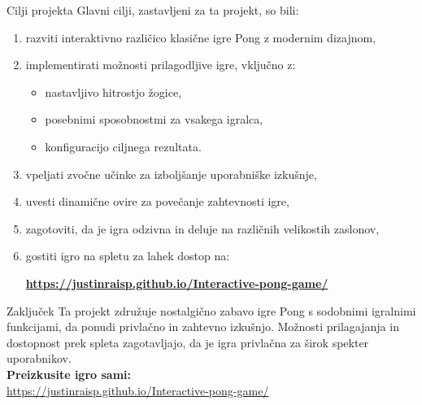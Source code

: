\documentclass{beamer}
\begin{document}
\begin{frame}{Cilji projekta}
    Glavni cilji, zastavljeni za ta projekt, so bili:
    \begin{enumerate}
        \item razviti interaktivno različico klasične igre Pong z modernim dizajnom,
        \item implementirati možnosti prilagodljive igre, vključno z:
            \begin{itemize}
                \item nastavljivo hitrostjo žogice,
                \item posebnimi sposobnostmi za vsakega igralca,
                \item konfiguracijo ciljnega rezultata.
            \end{itemize}
        \item vpeljati zvočne učinke za izboljšanje uporabniške izkušnje,
        \item uvesti dinamične ovire za povečanje zahtevnosti igre,
        \item zagotoviti, da je igra odzivna in deluje na različnih velikostih zaslonov,
        \item gostiti igro na spletu za lahek dostop na:
        \begin{center}
            \textbf{\url{https://justinraisp.github.io/Interactive-pong-game/}}
        \end{center}
    \end{enumerate}
\end{frame}

\begin{frame}{Zaključek}
    Ta projekt združuje nostalgično zabavo igre Pong s sodobnimi igralnimi funkcijami, da ponudi privlačno in zahtevno izkušnjo. Možnosti prilagajanja in dostopnost prek spleta zagotavljajo, da je igra privlačna za širok spekter uporabnikov. \\
    
    \bigskip
    \textbf{Preizkusite igro sami:} \\
    \url{https://justinraisp.github.io/Interactive-pong-game/}
\end{frame}
\end{document}
